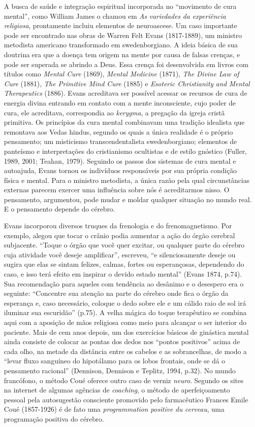 A busca de saúde e integração espiritual incorporada no ``movimento de
cura mental'', como William James o chamou em \emph{As variedades da
experiência religiosa}, prontamente incluiu elementos de neuroascese. Um
caso importante pode ser encontrado nas obras de Warren Felt Evans
(1817-1889), um ministro metodista americano transformado em
swedenborgiano. A ideia básica de sua doutrina era que a doença tem
origem na mente por causa de falsas crenças, e pode ser superada se
abrindo a Deus. Essa crença foi desenvolvida em livros com títulos como
\emph{Mental Cure} (1869), \emph{Mental Medicine} (1871), \emph{The
Divine Law of Cure} (1881), \emph{The Primitive Mind Cure} (1885) e
\emph{Esoteric Christianity and} \emph{Mental Therapeutics} (1886).
Evans acreditava ser possível acessar os recursos de cura de energia
divina entrando em contato com a mente inconsciente, cujo poder de cura,
ele acreditava, correspondia ao \emph{kerygma}, a pregação da igreja
cristã primitiva. Os princípios da cura mental combinavam uma tradição
idealista que remontava aos Vedas hindus, segundo os quais a única
realidade é o próprio pensamento; um misticismo transcendentalista
swedenborgiano; elementos de panteísmo e interpretações do cristianismo
ocultistas e de estilo gnóstico (Fuller, 1989, 2001; Teahan, 1979).
Seguindo os passos dos sistemas de cura mental e autoajuda, Evans tornou
os indivíduos responsáveis por sua própria condição física e mental.
Para o ministro metodista, a única razão pela qual circunstâncias
externas parecem exercer uma influência sobre nós é acreditarmos nisso.
O pensamento, argumentou, pode mudar e moldar qualquer situação no mundo
real. E o pensamento depende do cérebro.

Evans incorporou diversos truques da frenologia e do frenomagnetismo.
Por exemplo, alegou que tocar o crânio podia aumentar a ação do órgão
cerebral subjacente. ``Toque o órgão que você quer excitar, ou qualquer
parte do cérebro cuja atividade você deseje amplificar'', escreveu, ``e
silenciosamente deseje ou sugira que elas se sintam felizes, calmas,
fortes ou esperançosas, dependendo do caso, e isso terá efeito em
inspirar o devido estado mental'' (Evans 1874, p.74). Sua recomendação
para aqueles com tendência ao desânimo e o desespero era o seguinte:
``Concentre sua atenção na parte do cérebro onde fica o órgão da
esperança e, caso necessário, coloque o dedo sobre ele e um cálido raio
de sol irá iluminar sua escuridão'' (p.75). A velha mágica do toque
terapêutico se combina aqui com a aposição de mãos religiosa como meio
para alcançar o ser interior do paciente. Mais de cem anos depois, um
dos exercícios básicos de ginástica mental ainda consiste de colocar as
pontas dos dedos nos ``pontos positivos'' acima de cada olho, na metade
da distância entre os cabelos e as sobrancelhas, de modo a ``levar fluxo
sanguíneo do hipotálamo para os lobos frontais, onde se dá o pensamento
racional'' (Dennison, Dennison e Teplitz, 1994, p.32). No mundo
francófono, o método Coué oferece outro caso de verniz \emph{neuro}.
Segundo os sites na internet de algumas agências de \emph{coaching}, o
método de aperfeiçoamento pessoal pela autosugestão consciente promovido
pelo farmacêutico Frances Emile Coué (1857-1926) é de fato uma
\emph{programmation positive du cerveau}, uma programação positiva do
cérebro.

